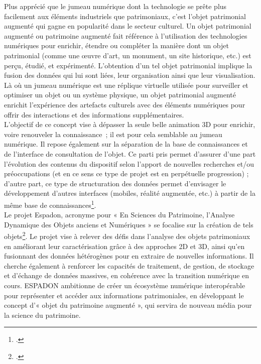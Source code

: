 Plus apprécié que le jumeau numérique dont la technologie se prête plus facilement aux éléments industriels que patrimoniaux, c’est l’objet patrimonial augmenté qui gagne en popularité dans le secteur culturel.
Un objet patrimonial augmenté ou patrimoine augmenté fait référence à l'utilisation des technologies numériques pour enrichir, étendre ou compléter la manière dont un objet patrimonial (comme une œuvre d'art, un monument, un site historique, etc.) est perçu, étudié, et expérimenté. 
L’obtention d’un tel objet patrimonial implique la fusion des données qui lui sont liées, leur organisation ainsi que leur visualisation.
Là où un jumeau numérique est une réplique virtuelle utilisée pour surveiller et optimiser un objet ou un système physique, un objet patrimonial augmenté enrichit l'expérience des artefacts culturels avec des éléments numériques pour offrir des interactions et des informations supplémentaires.\\ 

L’objectif de ce concept vise à dépasser la seule belle animation 3D pour enrichir, voire renouveler la connaissance ; il est pour cela semblable au jumeau numérique. Il repose également sur la séparation de la base de connaissances et de l’interface de consultation de l’objet. Ce parti pris permet d’assurer d’une part l’évolution des contenus du dispositif selon l’apport de nouvelles recherches et/ou préoccupations (et en ce sens ce type de projet est en perpétuelle progression) ; d’autre part, ce type de structuration des données permet d’envisager le développement d’autres interfaces (mobiles, réalité augmentée, etc.) à partir de la même base de connaissances\footcite{gasnierTechnHomTime2020}.\\

Le projet Espadon, acronyme pour « En Sciences du Patrimoine, l’Analyse Dynamique des Objets anciens et Numériques » se focalise sur la création de tels objets\footcite{EquipExESPADONFondation}. Le projet vise à relever des défis dans l'analyse des objets patrimoniaux en améliorant leur caractérisation grâce à des approches 2D et 3D, ainsi qu’en fusionnant des données hétérogènes pour en extraire de nouvelles informations. Il cherche également à renforcer les capacités de traitement, de gestion, de stockage et d'échange de données massives, en cohérence avec la transition numérique en cours. ESPADON ambitionne de créer un écosystème numérique interopérable pour représenter et accéder aux informations patrimoniales, en développant le concept d'« objet du patrimoine augmenté », qui servira de nouveau média pour la science du patrimoine. \\

